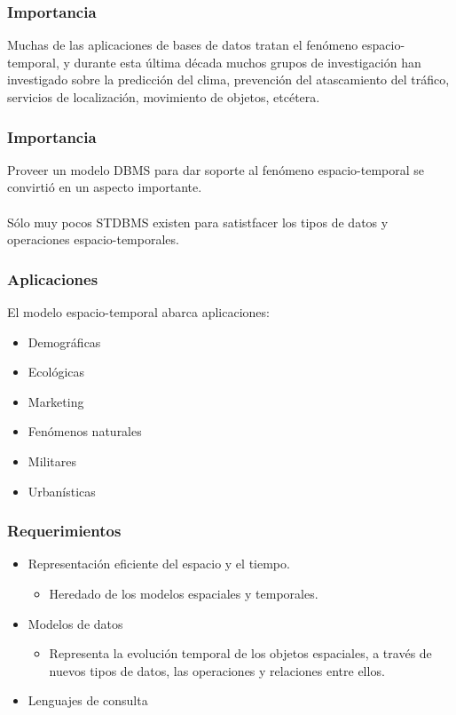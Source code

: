\documentclass[12pt]{beamer}
\begin{document}
\begin{frame}
\frametitle{Importancia}
Muchas de las aplicaciones de bases de datos tratan el fen\'omeno espacio-temporal, y durante esta \'ultima d\'ecada muchos grupos de investigaci\'on han investigado sobre la predicci\'on del clima, prevenci\'on del atascamiento del tr\'afico, servicios de localizaci\'on, movimiento de objetos, etc\'etera.
\end{frame}

\begin{frame}
\frametitle{Importancia}
Proveer un modelo DBMS para dar soporte al fen\'omeno espacio-temporal se convirti\'o en un aspecto importante.\\
\ \\
S\'olo muy pocos STDBMS existen para satistfacer los tipos de datos y operaciones espacio-temporales.
\end{frame}

\begin{frame}
\frametitle{Aplicaciones}
El modelo espacio-temporal abarca aplicaciones:
\begin{itemize}
\item Demogr\'aficas
\item Ecol\'ogicas
\item Marketing
\item Fen\'omenos naturales
\item Militares
\item Urban\'isticas
\end{itemize}
\end{frame}


\begin{frame}
\frametitle{Requerimientos}
\begin{itemize}
\item Representaci\'on eficiente del espacio y el tiempo.
\begin{itemize}
\item Heredado de los modelos espaciales y temporales.
\end{itemize}
\item Modelos de datos
\begin{itemize}
\item Representa la evoluci\'on temporal de los objetos espaciales, a trav\'es de nuevos tipos de datos, las operaciones y relaciones entre ellos.
\end{itemize}
\item Lenguajes de consulta

\end{itemize}
\end{frame}
\end{document}
